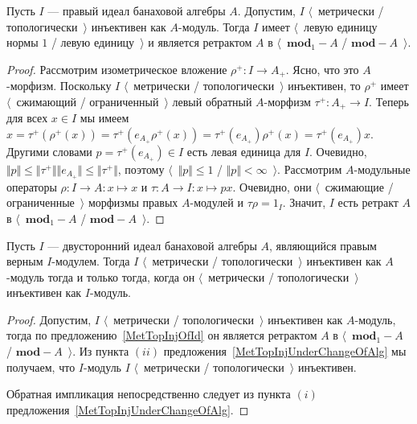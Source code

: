 \begin{proposition}\label{MetTopInjOfId} Пусть $I$ --- правый идеал банаховой
алгебры $A$. Допустим, $I$ $\langle$~метрически / топологически~$\rangle$
инъективен как $A$-модуль. Тогда $I$ имеет $\langle$~левую единицу нормы $1$ /
левую единицу~$\rangle$ и является ретрактом $A$ в $\langle$~$\mathbf{mod}_1-A$
/ $\mathbf{mod}-A$~$\rangle$.
\end{proposition}
\begin{proof} Рассмотрим изометрическое вложение $\rho^+:I\to A_+$. Ясно, что
это $A$-морфизм. Поскольку $I$ $\langle$~метрически / топологически~$\rangle$
инъективен, то $\rho^+$ имеет $\langle$~сжимающий / ограниченный~$\rangle$ левый
обратный $A$-морфизм $\tau^+:A_+\to I$. Теперь для всех $x\in I$ мы имеем
$x=\tau^+(\rho^+(x))=\tau^+(e_{A_+}\rho^+(x))
=\tau^+(e_{A_+})\rho^+(x)=\tau^+(e_{A_+})x$.
Другими словами $p=\tau^+(e_{A_+})\in I$ есть левая единица для $I$. Очевидно,
$\Vert p\Vert\leq\Vert\tau^+\Vert\Vert e_{A_+}\Vert\leq\Vert\tau^+\Vert$,
поэтому $\langle$~$\Vert p\Vert\leq 1$ / $\Vert p\Vert<\infty$~$\rangle$.
Рассмотрим $A$-модульные операторы $ \rho:I\to A:x\mapsto x$ и $\tau:A\to
I:x\mapsto p x$. Очевидно, они $\langle$~сжимающие / ограниченные~$\rangle$
морфизмы правых $A$-модулей и $\tau\rho=1_I$. Значит, $I$ есть ретракт $A$ в
$\langle$~$\mathbf{mod}_1-A$ / $\mathbf{mod}-A$~$\rangle$.
\end{proof}

\begin{proposition}\label{ReduceInjIdToInjAlg} Пусть $I$ --- двусторонний идеал
банаховой алгебры $A$, являющийся правым верным $I$-модулем. Тогда $I$
$\langle$~метрически / топологически~$\rangle$ инъективен как $A$-модуль тогда и
только тогда, когда он $\langle$~метрически / топологически~$\rangle$ инъективен
как $I$-модуль.
\end{proposition}
\begin{proof} Допустим, $I$ $\langle$~метрически / топологически~$\rangle$
инъективен как $A$-модуль, тогда по предложению~\ref{MetTopInjOfId} он является
ретрактом $A$ в $\langle$~$\mathbf{mod}_1-A$ / $\mathbf{mod}-A$~$\rangle$. Из
пункта $(ii)$ предложения~\ref{MetTopInjUnderChangeOfAlg} мы получаем, что
$I$-модуль $I$ $\langle$~метрически / топологически~$\rangle$ инъективен. 

Обратная импликация непосредственно следует из пункта $(i)$
предложения~\ref{MetTopInjUnderChangeOfAlg}.
\end{proof}
